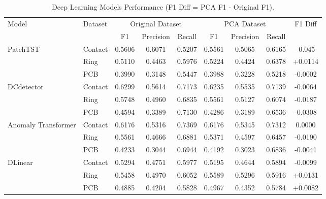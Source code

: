 \begin{table}[htbp]
    \centering
    \caption{Deep Learning Models Performance (F1 Diff = PCA F1 - Original F1).}
    \begin{tabular}{l|l|ccc|ccc|c}
        \hline
        \multirow{2}{*}{Model} & \multirow{2}{*}{Dataset} & \multicolumn{3}{c|}{Original Dataset} & \multicolumn{3}{c|}{PCA Dataset} & \multirow{2}{*}{F1 Diff} \\
        \cline{3-8}
        & & F1 & Precision & Recall & F1 & Precision & Recall & \\
        \hline
        \multirow{3}{*}{PatchTST} & Contact & 0.5606 & 0.6071 &0.5207 & 0.5561 & 0.5065 & 0.6165 & -0.045 \\
                                  & Ring    & 0.5110 & 0.4463 & 0.5976 & 0.5224 & 0.4424 & 0.6378 & +0.0114 \\
                                  & PCB     & 0.3990 & 0.3148 & 0.5447 & 0.3988 & 0.3228 & 0.5218 & -0.0002 \\
        \hline
        \multirow{3}{*}{DCdetector} & Contact & 0.6299 & 0.5614 & 0.7173 & 0.6235 & 0.5535 & 0.7139 & -0.0064 \\
                                    & Ring    & 0.5748 & 0.4960 & 0.6835 & 0.5561 & 0.5127 & 0.6074 & -0.0187 \\
                                    & PCB     & 0.4594 & 0.3389 & 0.7130 & 0.4286 & 0.3189 & 0.6536 & -0.0308 \\
        \hline
        \multirow{3}{*}{Anomaly Transformer} & Contact & 0.6176 & 0.5316 & 0.7369 & 0.6176 & 0.5345 & 0.7312 & 0.0000 \\
                                             & Ring    & 0.5561 & 0.4666 & 0.6881 & 0.5371 & 0.4597 & 0.6457 & -0.0190 \\
                                             & PCB     & 0.4233 & 0.3044 & 0.6944 & 0.4192 & 0.3023 & 0.6836 & -0.0041 \\
        \hline
        \multirow{3}{*}{DLinear}  & Contact & 0.5294 & 0.4751 & 0.5977 & 0.5195 & 0.4644 & 0.5894 & -0.0099 \\
                                  & Ring    & 0.5458 & 0.4970 & 0.6052 & 0.5589 & 0.5296 & 0.5916 & +0.0131 \\
                                  & PCB     & 0.4885 & 0.4204 & 0.5828 & 0.4967 & 0.4352 & 0.5784 & +0.0082 \\
        \hline
    \end{tabular}
    \label{tab:dl_performance}
\end{table}


